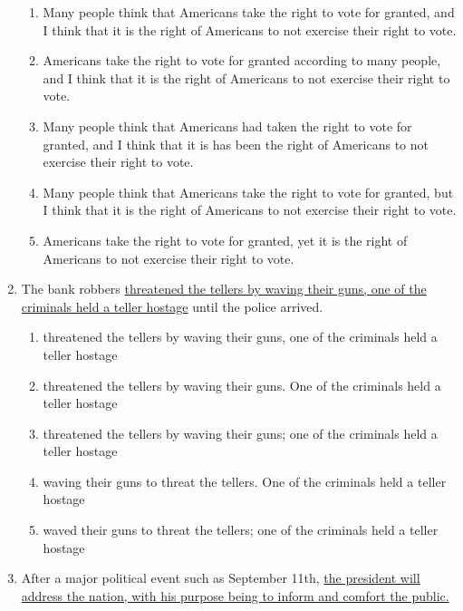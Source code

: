 \begin{enumerate}
\bigskip
\begin{enumerate}[label=(\Alph*)]
\item Many people think that Americans take the right to vote for granted, and I think that it is the right of Americans to not exercise their right to vote. \hrulefill
\item Americans take the right to vote for granted according to many people, and I think that it is the right of Americans to not exercise their right to vote.\hrulefill
\item Many people think that Americans had taken the right to vote for granted, and I think that it is has been the right of Americans to not exercise their right to vote. \hrulefill
\item Many people think that Americans take the right to vote for granted, but I think that it is the right of Americans to not exercise their right to vote.\hrulefill
\item Americans take the right to vote for granted, yet it is the right of Americans to not exercise their right to vote.\hrulefill
\end{enumerate}

\bigskip
\item The bank robbers \ul{threatened the tellers by waving their guns, one of the criminals held a teller hostage} until the police arrived. 

\bigskip
\begin{enumerate}[label=(\Alph*)]
\item threatened the tellers by waving their guns, one of the criminals held a teller hostage \hrulefill
\item threatened the tellers by waving their guns. One of the criminals held a teller hostage\hrulefill
\item threatened the tellers by waving their guns; one of the criminals held a teller hostage\hrulefill
\item waving their guns to threat the tellers. One of the criminals held a teller hostage\hrulefill
\item waved their guns to threat the tellers; one of the criminals held a teller hostage\hrulefill
\end{enumerate}

\bigskip
\item After a major political event such as September 11th, \ul{the president will address the nation, with his purpose being to inform and comfort the public.}


\end{enumerate}
